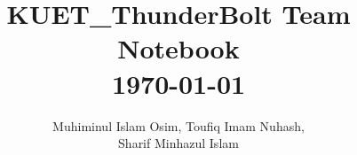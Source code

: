 \documentclass[8pt, a4paper, onesided]{article}
\title{\vspace{-2.5ex}\Large{KUET\_ThunderBolt Team Notebook\\\today}}
\author{Muhiminul Islam Osim, Toufiq Imam Nuhash,\\Sharif Minhazul Islam}
\date{}
\begin{document}
\begin{multicols*}{2}

\maketitle
\vspace{-7ex}
\tableofcontents
\pagestyle{fancy}
 
\raggedbottom

\end{multicols*}
%

\end{document}
